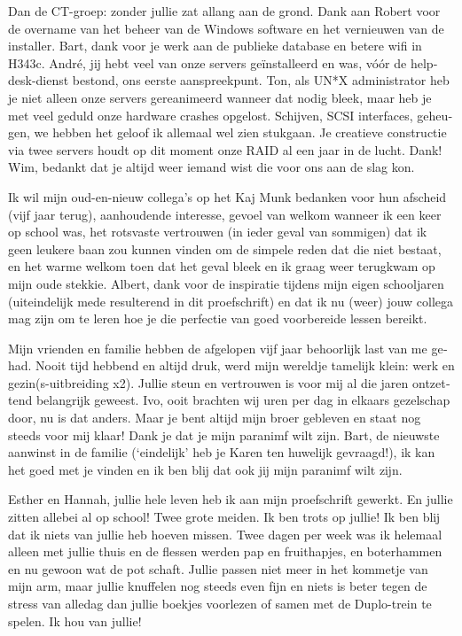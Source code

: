 \begin{otherlanguage}{dutch}
Dan de CT-groep: zonder jullie zat \hisparc allang aan de grond.  Dank aan
Robert voor de overname van het beheer van de Windows software en het
vernieuwen van de installer.  Bart, dank voor je werk aan de publieke
database en betere wifi in H343c.  André, jij hebt veel van onze servers
geïnstalleerd en was, vóór de helpdesk-dienst bestond, ons eerste
aanspreekpunt.  Ton, als UN*X administrator heb je niet alleen onze
servers gereanimeerd wanneer dat nodig bleek, maar heb je met veel geduld
onze hardware crashes opgelost.  Schijven, SCSI interfaces, geheugen, we
hebben het geloof ik allemaal wel zien stukgaan.  Je creatieve constructie
via twee servers houdt op dit moment onze RAID al een jaar in de lucht.
Dank!  Wim, bedankt dat je altijd weer iemand wist die voor ons aan de
slag kon.

Ik wil mijn oud-en-nieuw collega's op het Kaj Munk bedanken voor hun
afscheid (vijf jaar terug), aanhoudende interesse, gevoel van welkom
wanneer ik een keer op school was, het rotsvaste vertrouwen (in ieder
geval van sommigen) dat ik geen leukere baan zou kunnen vinden om de
simpele reden dat die niet bestaat, en het warme welkom toen dat het geval
bleek en ik graag weer terugkwam op mijn oude stekkie.  Albert, dank voor
de inspiratie tijdens mijn eigen schooljaren (uiteindelijk mede
resulterend in dit proefschrift) en dat ik nu (weer) jouw collega mag zijn
om te leren hoe je die perfectie van goed voorbereide lessen bereikt.

Mijn vrienden en familie hebben de afgelopen vijf jaar behoorlijk last van
me gehad.  Nooit tijd hebbend en altijd druk, werd mijn wereldje tamelijk
klein: werk en gezin(s-uitbreiding x2).  Jullie steun en vertrouwen is
voor mij al die jaren ontzettend belangrijk geweest.  Ivo, ooit brachten
wij uren per dag in elkaars gezelschap door, nu is dat anders.  Maar je
bent altijd mijn broer gebleven en staat nog steeds voor mij klaar!  Dank
je dat je mijn paranimf wilt zijn.  Bart, de nieuwste aanwinst in de
familie (`eindelijk' heb je Karen ten huwelijk gevraagd!), ik kan het goed
met je vinden en ik ben blij dat ook jij mijn paranimf wilt zijn.

Esther en Hannah, jullie hele leven heb ik aan mijn proefschrift gewerkt.
En jullie zitten allebei al op school!  Twee grote meiden.  Ik ben trots
op jullie!  Ik ben blij dat ik niets van jullie heb hoeven missen.  Twee
dagen per week was ik helemaal alleen met jullie thuis en de flessen
werden pap en fruithapjes, en boterhammen en nu gewoon wat de pot schaft.
Jullie passen niet meer in het kommetje van mijn arm, maar jullie
knuffelen nog steeds even fijn en niets is beter tegen de stress van
alledag dan jullie boekjes voorlezen of samen met de Duplo-trein te
spelen.  Ik hou van jullie!


\end{otherlanguage}
